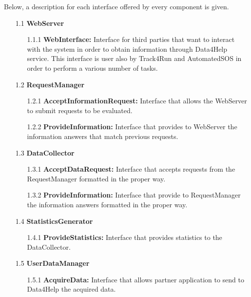 \noindent
Below, a description for each interface offered by every component is given. 
\begin{center}
\begin{enumerate}
\item[1.1] \textbf{WebServer}
	\begin{enumerate}[nolistsep]
		\item[1.1.1] \textbf{WebInterface:} Interface for third parties that want to interact with the system in order to obtain information through Data4Help service. This interface is user also by Track4Run and AutomatedSOS in order to perform a various number of tasks.
	\end{enumerate}
	
\item[1.2] \textbf{RequestManager}
	\begin{enumerate}[nolistsep]
		\item[1.2.1] \textbf{AcceptInformationRequest:} Interface that allows the WebServer to submit requests to be evaluated.
		\item[1.2.2] \textbf{ProvideInformation:} Interface that provides to WebServer the information answers that match previous requests.
	\end{enumerate}

\item[1.3] \textbf{DataCollector}
	\begin{enumerate}[nolistsep]
		\item[1.3.1] \textbf{AcceptDataRequest:} Interface that accepts requests from the RequestManager formatted in the proper way.
		\item[1.3.2] \textbf{ProvideInformation:} Interface that provide to RequestManager the information answers formatted in the proper way.
	\end{enumerate}
	
\item[1.4] \textbf{StatisticsGenerator}
	\begin{enumerate}[nolistsep]
		\item[1.4.1] \textbf{ProvideStatistics:} Interface that provides statistics to the DataCollector.
	\end{enumerate}
	
\item[1.5] \textbf{UserDataManager}
	\begin{enumerate}[nolistsep]
		\item[1.5.1] \textbf{AcquireData:} Interface that allows partner application to send to Data4Help the acquired data.
	\end{enumerate}


\end{enumerate}
\end{center}
